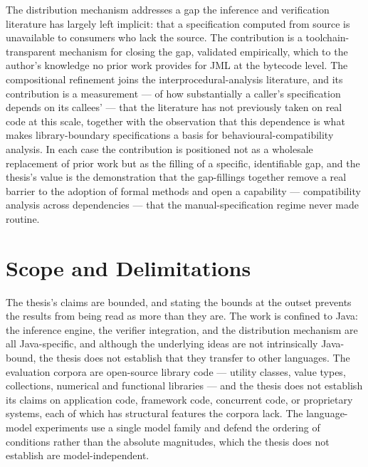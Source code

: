 The distribution mechanism addresses a gap the inference and verification
literature has largely left implicit: that a specification computed from source is
unavailable to consumers who lack the source. The contribution is a
toolchain-transparent mechanism for closing the gap, validated empirically, which
to the author's knowledge no prior work provides for JML at the bytecode level.
The compositional refinement joins the interprocedural-analysis literature, and its
contribution is a measurement --- of how substantially a caller's specification
depends on its callees' --- that the literature has not previously taken on real
code at this scale, together with the observation that this dependence is what
makes library-boundary specifications a basis for behavioural-compatibility
analysis. In each case the contribution is positioned not as a wholesale
replacement of prior work but as the filling of a specific, identifiable gap, and
the thesis's value is the demonstration that the gap-fillings together remove a
real barrier to the adoption of formal methods and open a capability ---
compatibility analysis across dependencies --- that the manual-specification regime
never made routine.

\section{Scope and Delimitations}

The thesis's claims are bounded, and stating the bounds at the outset prevents the
results from being read as more than they are. The work is confined to Java: the
inference engine, the verifier integration, and the distribution mechanism are all
Java-specific, and although the underlying ideas are not intrinsically Java-bound,
the thesis does not establish that they transfer to other languages. The evaluation
corpora are open-source library code --- utility classes, value types, collections,
numerical and functional libraries --- and the thesis does not establish its claims
on application code, framework code, concurrent code, or proprietary systems, each
of which has structural features the corpora lack. The language-model experiments
use a single model family and defend the ordering of conditions rather than the
absolute magnitudes, which the thesis does not establish are model-independent.

